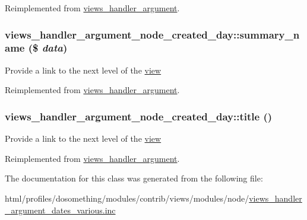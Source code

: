 Reimplemented from \hyperlink{classviews__handler__argument_aad03acefdb44288d7e6c7793bc33f66c}{views\_\-handler\_\-argument}.\hypertarget{classviews__handler__argument__node__created__day_acd7fa6e862306ba955d314d464e1cf2d}{
\subsubsection[{summary\_\-name}]{\setlength{\rightskip}{0pt plus 5cm}views\_\-handler\_\-argument\_\-node\_\-created\_\-day::summary\_\-name (\$ {\em data})}}
\label{classviews__handler__argument__node__created__day_acd7fa6e862306ba955d314d464e1cf2d}
Provide a link to the next level of the \hyperlink{classview}{view} 

Reimplemented from \hyperlink{classviews__handler__argument_a4c55a340453eed4d35c69f7ac790cac1}{views\_\-handler\_\-argument}.\hypertarget{classviews__handler__argument__node__created__day_abf71aafe50941da8e9ad6b4e1627833a}{
\subsubsection[{title}]{\setlength{\rightskip}{0pt plus 5cm}views\_\-handler\_\-argument\_\-node\_\-created\_\-day::title ()}}
\label{classviews__handler__argument__node__created__day_abf71aafe50941da8e9ad6b4e1627833a}
Provide a link to the next level of the \hyperlink{classview}{view} 

Reimplemented from \hyperlink{classviews__handler__argument_a76181ac24e7be4a09aaafc1fa5f15ea1}{views\_\-handler\_\-argument}.

The documentation for this class was generated from the following file:\begin{DoxyCompactItemize}
\item 
html/profiles/dosomething/modules/contrib/views/modules/node/\hyperlink{views__handler__argument__dates__various_8inc}{views\_\-handler\_\-argument\_\-dates\_\-various.inc}\end{DoxyCompactItemize}
